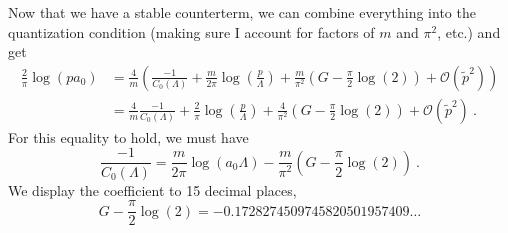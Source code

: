 Now that we have a stable counterterm, we can combine everything into the quantization condition (making sure I account for factors of $m$ and $\pi^2$, etc.) and get
\begin{align}
\frac{2}{\pi}\log(p a_0)&=\frac{4}{m} \left(\frac{-1}{C_{0}(\Lambda)}+\frac{m}{2 \pi} \log\left(\frac{p}{\Lambda}\right)+\frac{m}{\pi^2}\left(G-\frac{\pi}{2}\log(2)\right)+\mathcal{O}(\tilde p^2)\right)\nonumber\\
&=\frac{4}{m} \frac{-1}{C_{0}(\Lambda)}+\frac{2}{\pi}\log\left(\frac{p}{\Lambda}\right)+\frac{4}{\pi^2}\left(G-\frac{\pi}{2}\log(2)\right)+\mathcal{O}(\tilde p^2)\ .
\end{align}
For this equality to hold, we must have
\begin{equation}\label{eqn:ta da}
\boxed{
 \frac{-1}{C_{0}(\Lambda)}=\frac{m}{2\pi}\log\left(a_0\Lambda\right)-\frac{m}{\pi^2}\left(G-\frac{\pi}{2}\log(2)\right)
 }\ .
 \end{equation}
We display the coefficient to 15 decimal places,
\begin{displaymath}
G-\frac{\pi}{2}\log(2)=-0.1728274509745820501957409\ldots
\end{displaymath}

